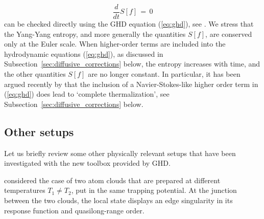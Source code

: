 \documentclass[onecolumn,amsfonts,showpacs,superscriptaddress]{revtex4-1}
\begin{document}
\begin{equation}
    \frac{d}{dt} S[f] \, = \, 0
\end{equation}
can be checked directly using the GHD equation (\ref{eq:ghd}), see \citep{caux2019hydrodynamics}. We stress that the Yang-Yang entropy, and more generally the quantities $S[f]$, are conserved only at the Euler scale. When higher-order terms are included into the hydrodynamic equations (\ref{eq:ghd}), as discussed in Subsection~\ref{sec:diffusive_corrections} below, the entropy increases with time, and the other quantities $S[f]$ are no longer constant. In particular, it has been argued recently by \citep{bastianello_thermalization_2020} that the inclusion of a Navier-Stokes-like higher order term in (\ref{eq:ghd}) does lead to `complete thermalization', see Subsection~\ref{sec:diffusive_corrections} below.



\subsection{Other setups}
\label{subsec:other_setups}
Let us briefly review some other physically relevant setups that have been investigated with the new toolbox provided by GHD. 

\cite{de2018edge} considered the case of two atom clouds that are prepared at different temperatures $T_1 \neq T_2$, put in the same trapping potential. At the junction between the two clouds, the local state displays an edge singularity in its response function and quasilong-range order.
\end{document}
